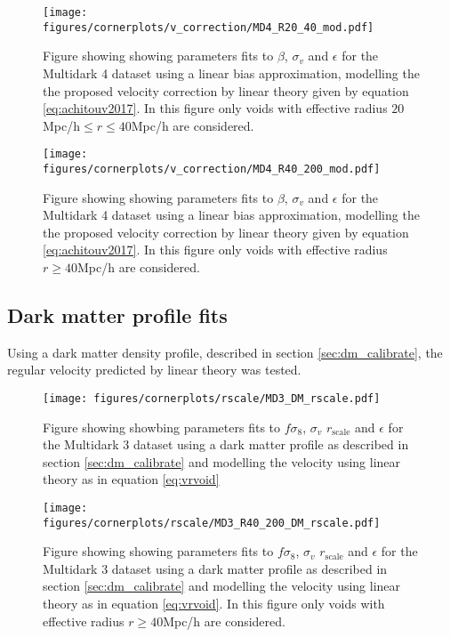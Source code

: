 \begin{figure}[htbp]
    \texttt{[image: figures/cornerplots/v\_correction/MD4\_R20\_40\_mod.pdf]}
    \caption{Figure showing showing parameters fits to $\beta$, $\sigma_v$ and $\epsilon$ for the Multidark 4 dataset using a linear bias approximation, modelling the the proposed velocity correction by \cite{Achitouv_streaming} linear theory given by equation \ref{eq:achitouv2017}. In this figure only voids with effective radius $20$Mpc/h$\leq r \leq 40$Mpc/h are considered.}
    \label{fig:linbiasMD4modR2040}
\end{figure}

\begin{figure}[htbp]
    \texttt{[image: figures/cornerplots/v\_correction/MD4\_R40\_200\_mod.pdf]}
    \caption{Figure showing showing parameters fits to $\beta$, $\sigma_v$ and $\epsilon$ for the Multidark 4 dataset using a linear bias approximation, modelling the the proposed velocity correction by \cite{Achitouv_streaming} linear theory given by equation \ref{eq:achitouv2017}. In this figure only voids with effective radius $r \geq 40$Mpc/h are considered.}
    \label{fig:linbiasMD4modR40}
\end{figure}

\subsection{Dark matter profile fits}
Using a dark matter density profile, described in section \ref{sec:dm_calibrate}, the regular velocity predicted by linear theory was tested.
\begin{figure}[htbp]
    \texttt{[image: figures/cornerplots/rscale/MD3\_DM\_rscale.pdf]}
    \caption{Figure showing showbing parameters fits to $f\sigma_8$, $\sigma_v$ $r_{\mathrm{scale}}$ and $\epsilon$ for the Multidark 3 dataset using a dark matter profile as described in section \ref{sec:dm_calibrate} and modelling the velocity using linear theory as in equation \ref{eq:vrvoid}}
    \label{fig:MD3DM}
\end{figure}

\begin{figure}[htbp]
    \texttt{[image: figures/cornerplots/rscale/MD3\_R40\_200\_DM\_rscale.pdf]}
    \caption{Figure showing showing parameters fits to $f\sigma_8$, $\sigma_v$ $r_{\mathrm{scale}}$ and $\epsilon$ for the Multidark 3 dataset using a dark matter profile as described in section \ref{sec:dm_calibrate} and modelling the velocity using linear theory as in equation \ref{eq:vrvoid}. In this figure only voids with effective radius $r \geq 40$Mpc/h are considered.}
    \label{fig:MD3DMR40}
\end{figure}

